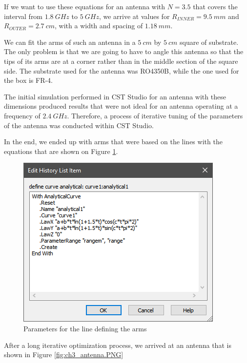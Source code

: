 \par If we want to use these equations for an antenna with $N = 3.5$ that covers the interval from $1.8\:\si{GHz}$ to $5\:\si{GHz}$, we arrive at values for $R_{INNER} = 9.5\:\si{mm}$ and $R_{OUTER} = 2.7\:\si{cm}$, with a width and spacing of $1.18\:\si{mm}$.

\par We can fit the arms of such an antenna in a $5\:\si{cm}$ by $5\:\si{cm}$ square of substrate. The only problem is that we are going to have to angle this antenna so that the tips of its arms are at a corner rather than in the middle section of the square side. The substrate used for the antenna was RO4350B, while the one used for the box is FR-4.

\par The initial simulation performed in CST Studio for an antenna with these dimensions produced results that were not ideal for an antenna operating at a frequency of $2.4\:\si{GHz}$. Therefore, a process of iterative tuning of the parameters of the antenna was conducted within CST Studio.

\par In the end, we ended up with arms that were based on the lines with the equations that are shown on Figure \ref{fig:ch3_Spiral.png}.

\begin{figure}[H]
    \vspace*{0cm}
    \centering
    \includegraphics[width=0.5\linewidth]{figs/ch3_Spiral.png}
    \caption{Parameters for the line defining the arms}
    \label{fig:ch3_Spiral.png}
\end{figure}

\par After a long iterative optimization process, we arrived at an antenna that is shown in Figure \ref{fig:ch3_antenna.PNG}

